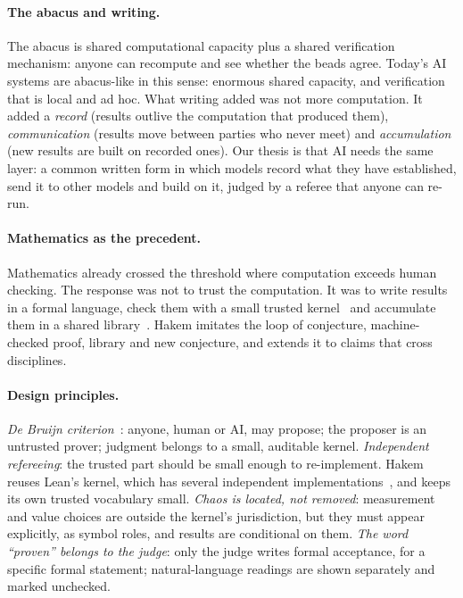 \documentclass[11pt]{article}
\begin{document}
\paragraph{The abacus and writing.}
The abacus is shared computational capacity plus a shared verification mechanism: anyone
can recompute and see whether the beads agree. Today's AI systems are abacus-like in this
sense: enormous shared capacity, and verification that is local and ad hoc. What writing
added was not more computation. It added a \emph{record} (results outlive the computation
that produced them), \emph{communication} (results move between parties who never meet) and
\emph{accumulation} (new results are built on recorded ones). Our thesis is that AI needs
the same layer: a common written form in which models record what they have established,
send it to other models and build on it, judged by a referee that anyone can re-run.

\paragraph{Mathematics as the precedent.}
Mathematics already crossed the threshold where computation exceeds human checking. The
response was not to trust the computation. It was to write results in a formal language,
check them with a small trusted kernel~\cite{demoura2021lean4} and accumulate them in a shared
library~\cite{mathlib2020}. Hakem imitates the loop of conjecture, machine-checked proof,
library and new conjecture, and extends it to claims that cross disciplines.

\paragraph{Design principles.}
\emph{De Bruijn criterion}~\cite{barendregt2005challenge}: anyone, human or AI, may propose;
the proposer is an untrusted prover; judgment belongs to a small, auditable kernel.
\emph{Independent refereeing}: the trusted part should be small enough to re-implement.
Hakem reuses Lean's kernel, which has several independent implementations~\cite{carneiro2024lean4lean},
and keeps its own trusted vocabulary small. \emph{Chaos is located, not removed}:
measurement and value choices are outside the kernel's jurisdiction, but they must appear
explicitly, as symbol roles, and results are conditional on them. \emph{The word ``proven''
belongs to the judge}: only the judge writes formal acceptance, for a specific formal
statement; natural-language readings are shown separately and marked unchecked.
\end{document}
